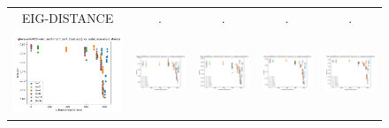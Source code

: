 \begin{figure}
\begin{tabular}{@{\hskip -0.0in}c@{\hskip -0.0in}c@{\hskip -0.0in}c@{\hskip -0.0in}c@{\hskip -0.0in}c@{\hskip -0.0in}}
		EIG-DISTANCE & . & . & . & .\\
		\includegraphics[width=.2\linewidth]{figures/glove-wiki400k-am_sentiment_mr_test-acc_vs_subspace-eig-distance_linx.pdf} &
		\includegraphics[width=.2\linewidth]{figures/glove-wiki400k-am_sentiment_subj_test-acc_vs_subspace-eig-distance_linx.pdf} &
		\includegraphics[width=.2\linewidth]{figures/glove-wiki400k-am_sentiment_cr_test-acc_vs_subspace-eig-distance_linx.pdf} &
		\includegraphics[width=.2\linewidth]{figures/glove-wiki400k-am_sentiment_sst_test-acc_vs_subspace-eig-distance_linx.pdf} &
		\includegraphics[width=.2\linewidth]{figures/glove-wiki400k-am_sentiment_mpqa_test-acc_vs_subspace-eig-distance_linx.pdf} \\
		

\end{tabular}
\end{figure}
